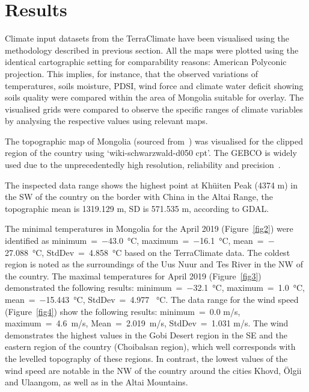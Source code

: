 \documentclass[geosciences,article,accept,pdftex,oneauthor]{Definitions/mdpi}
\begin{document}
\section{Results}

Climate input datasets from the TerraClimate have been visualised using the methodology described in previous section. All the maps were plotted using the identical cartographic setting for comparability reasons: American Polyconic projection. This implies, for instance, that the observed variations of temperatures, soils moisture, PDSI, wind force and climate water deficit showing soils quality were compared within the area of Mongolia suitable for overlay. The visualised grids were compared to observe the specific ranges of climate variables by analysing the respective values using relevant maps.

The topographic map of Mongolia (sourced from~\cite{GEBCO}) was visualised for the clipped region of the country using ‘wiki-schwarzwald-d050 cpt’. The GEBCO is widely used due to the unprecedentedly high resolution, reliability and precision~\cite{Liuetal2019,Nock,Lemenkova2020m,Saito}. 



The inspected data range shows the highest point at Khüiten Peak (4374 m) in the SW of the country on the border with China in the Altai Range, the topographic mean is 1319.129 m, SD is 571.535 m, according to GDAL. 




The minimal temperatures in Mongolia for the April 2019 (Figure~\ref{fig2}) were identified as minimum~=~$-$43.0~°C, maximum~=~$-$16.1~°C, mean~=~$-$27.088~°C, StdDev~=~4.858~°C based on the TerraClimate data. The coldest region is noted as the surroundings of the Uus Nuur and Tes River in the NW of the country. The maximal temperatures for April 2019 (Figure~\ref{fig3}) demonstrated the following results: minimum~=~$-$32.1~°C, maximum~=~1.0~°C, mean~=~$-$15.443~°C, StdDev~=~4.977 ~°C. The data range for the wind speed (Figure~\ref{fig4}) show the following results: minimum~=~0.0 m/s, maximum~=~4.6~m/s, Mean~=~2.019~m/s, StdDev~=~1.031 m/s. The wind demonstrates the highest values in the Gobi Desert region in the SE and the eastern region of the country (Choibalsan region), which well corresponds with the levelled topography of these regions. In contrast, the lowest values of the wind speed are notable in the NW of the country around the cities Khovd, \"Olgii and Ulaangom, as well as in the Altai Mountains.
\end{document}
